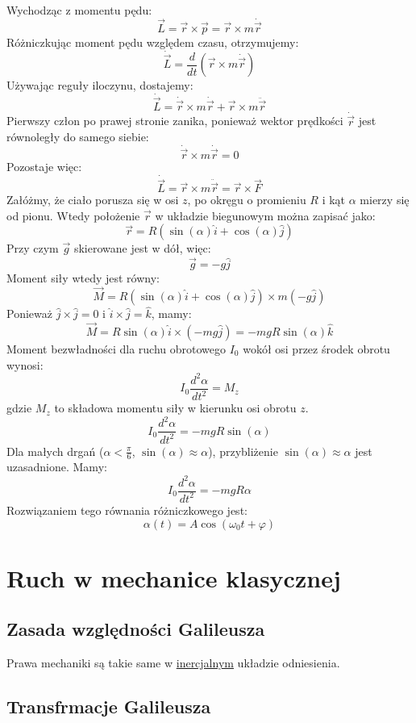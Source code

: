 \documentclass{article}
\theoremstyle{definition}
\theoremstyle{definition}
\theoremstyle{definition}
\theoremstyle{definition}
\begin{document}
Wychodząc z momentu pędu:
\[\vec{L} = \vec{r} \times \vec{p} = \vec{r} \times m \dot{\vec{r}}\]
Różniczkując moment pędu względem czasu, otrzymujemy:
\[
\dot{\vec{L}} = \frac{d}{dt} \left( \vec{r} \times m \dot{\vec{r}} \right)
\]
Używając reguły iloczynu, dostajemy:
\[
\dot{\vec{L}} = \dot{\vec{r}} \times m \dot{\vec{r}} + \vec{r} \times m \ddot{\vec{r}}
\]
Pierwszy człon po prawej stronie zanika, ponieważ wektor prędkości $\dot{\vec{r}}$ jest równoległy do samego siebie:
\[
\dot{\vec{r}} \times m \dot{\vec{r}} = 0
\]
Pozostaje więc:
\[
\dot{\vec{L}} = \vec{r} \times m \ddot{\vec{r}} = \vec{r} \times \vec{F}
\]
Załóżmy, że ciało porusza się w osi $z$, po okręgu o promieniu \(R\) i kąt \(\alpha\) mierzy się od pionu. Wtedy położenie \(\vec{r}\) w układzie biegunowym można zapisać jako:
\[
\vec{r} = R (\sin(\alpha) \hat{i} + \cos(\alpha) \hat{j})
\]
Przy czym \(\vec{g}\) skierowane jest w dół, więc:
\[
\vec{g} = -g \hat{j}
\]
Moment siły wtedy jest równy:
\[
\vec{M} = R (\sin(\alpha) \hat{i} + \cos(\alpha) \hat{j}) \times m (-g \hat{j})
\]
Ponieważ \(\hat{j} \times \hat{j} = 0\) i \(\hat{i} \times \hat{j} = \hat{k}\), mamy:
\[
\vec{M} = R \sin(\alpha) \hat{i} \times (-mg \hat{j}) = -mgR \sin(\alpha) \hat{k}
\]
Moment bezwładności dla ruchu obrotowego \(I_0\) wokół osi przez środek obrotu wynosi:
\[
I_0 \frac{d^2 \alpha}{dt^2} = M_z
\]
gdzie \(M_z\) to składowa momentu siły w kierunku osi obrotu \(z\).
\[
I_0 \frac{d^2 \alpha}{dt^2} = -mgR \sin(\alpha)
\]
Dla małych drgań ($\alpha<\frac{\pi}{6}$, $\sin(\alpha)\approx \alpha$), przybliżenie \(\sin(\alpha) \approx \alpha\) jest uzasadnione. Mamy:
\[
I_0 \frac{d^2 \alpha}{dt^2} = -mgR \alpha
\]
Rozwiązaniem tego równania różniczkowego jest:
\[
\boxed{
\alpha(t) = A\cos(\omega_0 t + \varphi)
}
\]

\section{Ruch w mechanice klasycznej}

\subsection{Zasada względności Galileusza}

Prawa mechaniki są takie same w \underline{inercjalnym} układzie odniesienia.

\subsection{Transfrmacje Galileusza}
\end{document}

